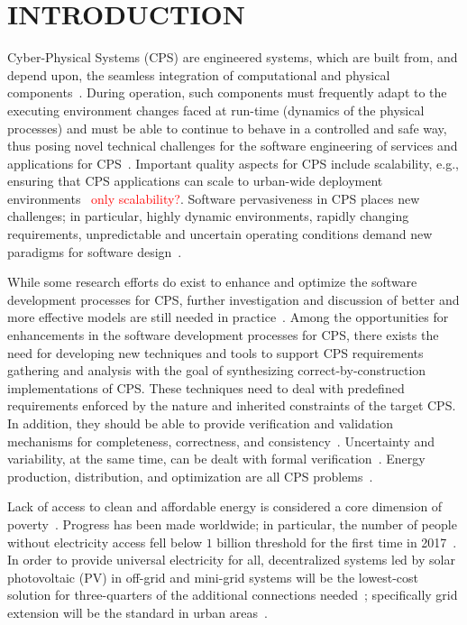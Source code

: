 \documentclass[review]{elsarticle}
\begin{document}

\section{INTRODUCTION}

Cyber-Physical Systems  (CPS) are engineered systems, which are built from, and depend upon, 
the seamless integration of computational and physical  components~\cite{NSF2015}. 
During operation, such components must frequently adapt to the executing environment changes 
faced at run-time (dynamics of the physical processes) and must be able to continue to behave 
in a controlled and safe way, thus posing novel technical challenges for the software engineering 
of services and applications for CPS~\cite{Metzger2014}. Important quality aspects for CPS include scalability, 
e.g., ensuring that CPS applications can scale to urban-wide deployment environments~\cite{NESSI} \textcolor{red}{only scalability?}.
Software pervasiveness in CPS places new challenges; in particular, highly dynamic environments, 
rapidly changing requirements, unpredictable and uncertain operating conditions demand new paradigms for software design~\cite{Filieri2015}.

While some research efforts do exist to enhance and optimize the software development 
processes for CPS, further investigation and discussion of better and more effective models 
are still needed in practice~\cite{Al-Jaroodi2016}. Among the opportunities for enhancements 
in the software development processes for CPS, there exists the need for developing new techniques 
and tools to support CPS requirements gathering and analysis with the goal of synthesizing 
correct-by-construction implementations of CPS. These techniques need to deal with 
predefined requirements enforced by the nature and inherited constraints of the target CPS. 
In addition, they should be able to provide verification and validation mechanisms 
for completeness, correctness, and consistency~\cite{Al-Jaroodi2016}. 
Uncertainty and variability, at the same time, can be dealt with formal verification~\cite{NESSI}. 
Energy production, distribution, and optimization are all CPS problems~\cite{UC}. 

Lack of access to clean and affordable energy is considered a core 
dimension of poverty~\cite{Hussein2012}. Progress has been made worldwide; 
in particular, the number of people without electricity access fell below $1$ 
billion threshold for the first time in 2017~\cite{IEAweo2018}. In order to provide 
universal electricity for all, decentralized systems led by solar photovoltaic (PV) 
in off-grid and mini-grid systems will be the lowest-cost solution for three-quarters 
of the additional connections needed~\cite{Hussein2012}; 
specifically grid extension will be the standard in urban areas~\cite{IEAweo2018}.
\end{document}

